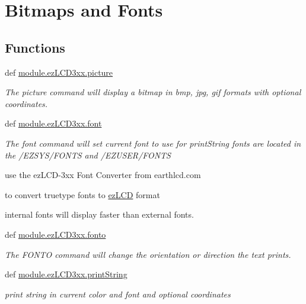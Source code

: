 \hypertarget{group___bitmap_font}{\section{Bitmaps and Fonts}
\label{group___bitmap_font}
}
\subsection*{Functions}
\begin{DoxyCompactItemize}
\item 
def \hyperlink{group___bitmap_font_ga675ef467cb7a69ab8c19024bfd0775d6}{module.\-ez\-L\-C\-D3xx.\-picture}
\begin{DoxyCompactList}\small\item\em The picture command will display a bitmap in bmp, jpg, gif formats with optional coordinates. \end{DoxyCompactList}\item 
def \hyperlink{group___bitmap_font_gaf4cf49efa8ac77f85a27f2bafe6b80cf}{module.\-ez\-L\-C\-D3xx.\-font}
\begin{DoxyCompactList}\small\item\em The font command will set current font to use for print\-String fonts are located in the /\-E\-Z\-S\-Y\-S/\-F\-O\-N\-T\-S and /\-E\-Z\-U\-S\-E\-R/\-F\-O\-N\-T\-S \par
 use the ez\-L\-C\-D-\/3xx Font Converter from earthlcd.\-com \par
 to convert truetype fonts to \hyperlink{classmodule_1_1ez_l_c_d3xx_1_1ez_l_c_d}{ez\-L\-C\-D} format \par
 internal fonts will display faster than external fonts. \end{DoxyCompactList}\item 
def \hyperlink{group___bitmap_font_ga9e4a0699fcde7bdd65fd97720b60b3d3}{module.\-ez\-L\-C\-D3xx.\-fonto}
\begin{DoxyCompactList}\small\item\em The F\-O\-N\-T\-O command will change the orientation or direction the text prints. \end{DoxyCompactList}\item 
def \hyperlink{group___bitmap_font_ga9156f7c9f1239d24a3a8a7ade64291d8}{module.\-ez\-L\-C\-D3xx.\-print\-String}
\begin{DoxyCompactList}\small\item\em print string in current color and font and optional coordinates \end{DoxyCompactList}\end{DoxyCompactItemize}


